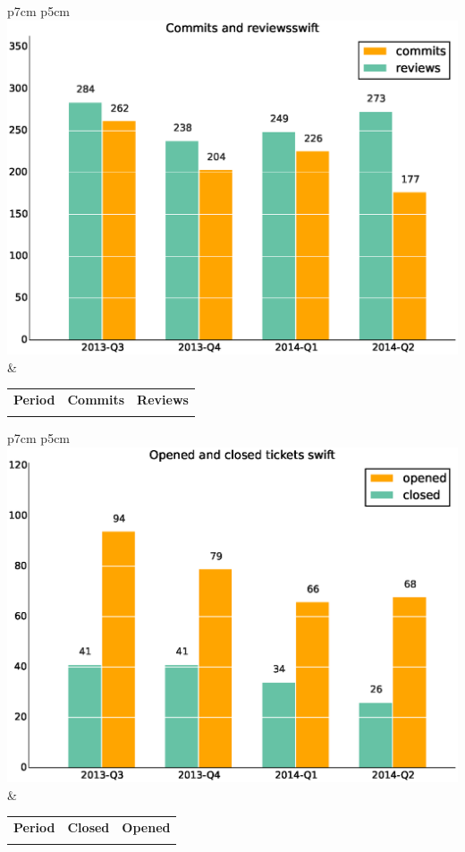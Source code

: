 \documentclass[a4wide,11pt]{report}
\begin{document}
\begin{tabular}{p{7cm} p{5cm}}
    \vspace{0pt} 
    \includegraphics[scale=.35]{figs/commitsswift.eps}
    & 
    \vspace{0pt}
    \begin{tabular}{l|r|r|}%
    \bfseries Period & \bfseries Commits & \bfseries Reviews %
    \csvreader[head to column names]{data/commitsswift.csv}{}%
    {\\ & \commits & \submitted}
    \end{tabular}
\end{tabular}

\begin{tabular}{p{7cm} p{5cm}}
    \vspace{0pt} 
    \includegraphics[scale=.35]{figs/closedswift.eps}
    & 
    \vspace{0pt}
    \begin{tabular}{l|r|r|}%
\bfseries Period & \bfseries Closed & \bfseries Opened
    \csvreader[head to column names]{data/closedswift.csv}{}%
    {\\ & \closed & \opened}
    \end{tabular}
\end{tabular}
\end{document}
